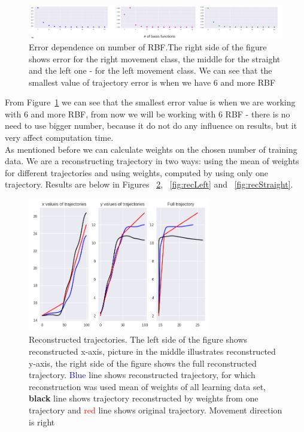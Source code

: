 \begin{figure}[H]
	\centering  	
	\includegraphics[width=17cm]{img/error.png}
	\caption{Error dependence on number of \gls{RBF}.The right side of the figure shows error for the right movement class, the middle for the straight and the left one - for the left movement class. We can see that the smallest value of trajectory error is when we have $6$ and more \gls{RBF}}
	\label{fig:error}    
\end{figure}

From Figure~\ref{fig:error} we can see that the smallest error value is when we are working with $6$ and more \gls{RBF}, from now we will be working with $6$ \gls{RBF} - there is no need to use bigger number, because it do not do any influence on results, but it very affect computation time.\\

As mentioned before we can calculate weights on the chosen number of training data. We are a reconstructing trajectory in two ways: using the mean of weights for different trajectories and using weights, computed by using only one trajectory. Results are below in Figures ~\ref{fig:recRight}, ~\ref{fig:recLeft} and ~\ref{fig:recStraight}.

\begin{figure}[H]
	\centering  	
	\includegraphics[width=8cm]{img/recRight.png}
	\caption{Reconstructed trajectories. The left side of the figure shows reconstructed x-axis, picture in the middle illustrates reconstructed y-axis, the right side of the figure shows the full reconstructed trajectory. \textcolor{blue}{Blue} line shows reconstructed trajectory, for which reconstruction was used mean of weights of all learning data set, \textbf{black} line shows trajectory reconstructed by weights from one trajectory and \textcolor{red}{red} line shows original trajectory. Movement direction is right}
	\label{fig:recRight}    
\end{figure}

